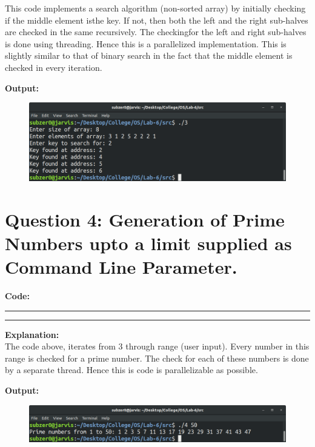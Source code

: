 \documentclass{article}
\begin{document}
This code implements a search algorithm (non-sorted array) by 
initially checking if the middle element isthe key.  If not, 
then both the left and the right sub-halves are checked in the 
same recursively.  The checkingfor the left and right sub-halves 
is done using threading.  Hence this is a parallelized 
implementation. This is slightly similar to that of binary 
search in the fact that the middle element is checked in every 
iteration.

\bigskip
\noindent
\textbf{\Large Output:}

\begin{figure}[h]
	\includegraphics[width=\textwidth]{output/3.png}
\end{figure}
\bigskip


\section*{Question 4: Generation of Prime Numbers upto a limit supplied as Command Line Parameter.}
\bigskip

\par\noindent
\textbf{\Large Code: }
\smallskip
\par\noindent\rule{\textwidth}{0.4pt}

\par\noindent\rule{\textwidth}{0.4pt}

\bigskip
\noindent
\textbf{\Large Explanation: } \\

The code above, iterates from 3 through range (user input). Every
number in this range is checked for a prime number. The check for 
each of these numbers is done by a separate thread. Hence this is 
code is parallelizable as possible.

\bigskip
\noindent
\textbf{\Large Output:}

\begin{figure}[h]
	\includegraphics[width=\textwidth]{output/4.png}
\end{figure}
\bigskip
\end{document}
